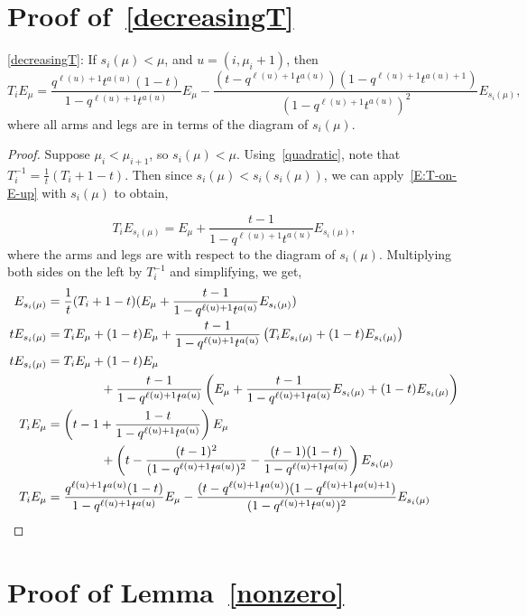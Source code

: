 \appendix


\section{\texorpdfstring{Proof of~\eqref{decreasingT}}{Proof of (6)}} 
\eqref{decreasingT}: If $s_i(\mu)<\mu$, and $u=(i,\mu_{i}+1)$, then
\[ T_iE_\mu = \frac{q^{\ell(u)+1}t^{a(u)}(1-t)}{1-q^{\ell(u)+1}t^{a(u)}}E_{\mu} - \frac{(t-q^{\ell(u)+1}t^{a(u)})(1-q^{\ell(u)+1}t^{a(u)+1})}{(1-q^{\ell(u)+1}t^{a(u)})^2} E_{s_i(\mu)},\]
where all arms and legs are in terms of the diagram of $s_i(\mu)$.
\begin{proof}
Suppose $\mu_i < \mu_{i+1}$, so  $s_i(\mu)<\mu$. Using~\eqref{quadratic}, note that $T_i^{-1} = \frac{1}{t}(T_i+1-t)$. Then since $s_i(\mu)<s_i(s_i(\mu))$, we can apply~\eqref{E:T-on-E-up} with $s_i(\mu)$ to obtain,

\[ T_i E_{s_i(\mu)} = E_\mu + \frac{t-1}{1-q^{\ell(u)+1}t^{a(u)}} E_{s_i(\mu)},\]
where the arms and legs are with respect to the diagram of $s_i(\mu)$. Multiplying both sides on the left by $T_i^{-1}$ and simplifying, we get,
\begin{align*}
E_{s_i(\mu)} &= \frac{1}{t}(T_i+1-t)(E_\mu + \frac{t-1}{1-q^{\ell(u)+1}t^{a(u)}}E_{s_i(\mu)})\\
tE_{s_i(\mu)} &= T_i E_\mu + (1-t) E_\mu + \frac{t-1}{1-q^{\ell(u)+1}t^{a(u)}} \left(T_i E_{s_i(\mu)} + (1-t) E_{s_i(\mu)} \right)\\
tE_{s_i(\mu)} &= T_i E_\mu + (1-t) E_\mu \\ &\hspace*{1.5cm} +\frac{t-1}{1-q^{\ell(u)+1}t^{a(u)}} \left( E_\mu + \frac{t-1}{1-q^{\ell(u)+1}t^{a(u)}} E_{s_i(\mu)} + (1-t) E_{s_i(\mu)} \right)\\
T_i E_\mu &= \left(t-1+\frac{1-t}{1-q^{\ell(u)+1}t^{a(u)}} \right) E_\mu \\ &\hspace*{1.5cm} + \left(t-\frac{(t-1)^2}{(1-q^{\ell(u)+1}t^{a(u)})^2} - \frac{(t-1)(1-t)}{1-q^{\ell(u)+1}t^{a(u)}} \right) E_{s_i(\mu)}\\
T_iE_\mu &= \frac{q^{\ell(u)+1}t^{a(u)}(1-t)}{1-q^{\ell(u)+1}t^{a(u)}}E_{\mu} - \frac{(t-q^{\ell(u)+1}t^{a(u)})(1-q^{\ell(u)+1}t^{a(u)+1})}{(1-q^{\ell(u)+1}t^{a(u)})^2} E_{s_i(\mu)}\qedhere
\end{align*}
\end{proof}


\section{Proof of Lemma~\ref{nonzero}}

